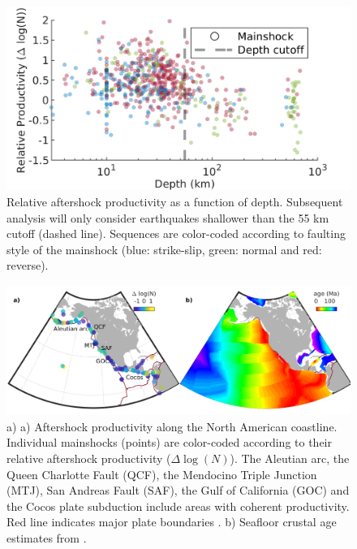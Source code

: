 \documentclass[draft]{agujournal}
\begin{document}
\begin{figure}
\centering
\includegraphics{figures/prod_vs_depth_mw5.png}
\caption{Relative aftershock productivity as a function of depth. Subsequent analysis will only consider earthquakes shallower than the 55 km cutoff (dashed line). Sequences are color-coded according to faulting style of the mainshock (blue: strike-slip, green: normal and red: reverse).}
\label{fig:prod_vs_depth}
\end{figure}


\begin{figure}
\centering
\includegraphics[]{figures/regions_mw5.png}
\caption{a) a) Aftershock productivity along the North American coastline.  Individual mainshocks (points) are color-coded according to their relative aftershock productivity ($\Delta \log(N)$). The Aleutian arc, the Queen Charlotte Fault (QCF), the Mendocino Triple Junction (MTJ), San Andreas Fault (SAF), the Gulf of California (GOC) and the Cocos plate subduction include areas with coherent productivity. Red line indicates major plate boundaries \citep{Bird2003AnBoundaries}. b) Seafloor crustal age estimates from \citet{Muller2008}.}
\label{fig:region}
\end{figure}  
\end{document}
